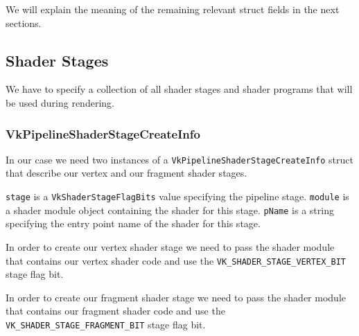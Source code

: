 We will explain the meaning of the remaining relevant struct fields
in the next sections.

\begin{minipage}{\linewidth}{\noindent}
    
\end{minipage}

\subsection{Shader Stages}

We have to specify a collection of all shader stages and shader programs that
will be used during rendering.

\begin{minipage}{\linewidth}{\noindent}
    
\end{minipage}

\subsubsection{VkPipelineShaderStageCreateInfo}

In our case we need two instances of a \texttt{VkPipelineShaderStageCreateInfo}
struct that describe our vertex and our fragment shader stages.

\texttt{stage} is a \texttt{VkShaderStageFlagBits} value specifying the
pipeline stage.
\texttt{module} is a shader module object containing the shader for this stage.
\texttt{pName} is a string specifying the entry point name of the shader for this
stage.

\begin{minipage}{\linewidth}{\noindent}
    
\end{minipage}

In order to create our vertex shader stage we need to pass the shader module
that contains our vertex shader code and use the
\texttt{VK\_SHADER\_STAGE\_VERTEX\_BIT} stage flag bit.

In order to create our fragment shader stage we need to pass the shader module
that contains our fragment shader code and use the
\mbox{\texttt{VK\_SHADER\_STAGE\_FRAGMENT\_BIT}} stage flag bit.

